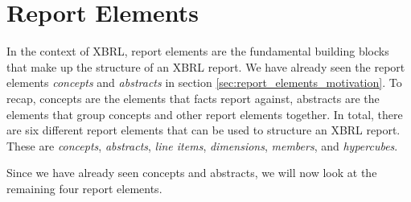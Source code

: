 \section{Report Elements}

In the context of XBRL, report elements are the fundamental building blocks that make up the structure of an XBRL report. 
We have already seen the report elements \textit{concepts} and \textit{abstracts} in section \ref{sec:report_elements_motivation}.
To recap, concepts are the elements that facts report against, abstracts are the elements that group concepts and other report elements together.
In total, there are six different report elements that can be used to structure an XBRL report.
These are \textit{concepts}, \textit{abstracts}, \textit{line items}, \textit{dimensions}, \textit{members}, and \textit{hypercubes}.

Since we have already seen concepts and abstracts, we will now look at the remaining four report elements.




